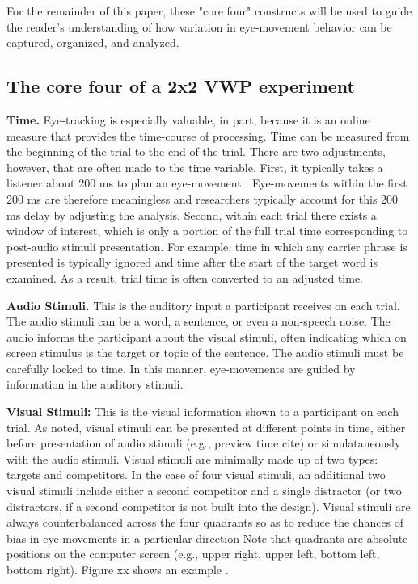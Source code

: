 For the remainder of this paper, these "core four" constructs will be used to guide the reader's understanding of how variation in eye-movement behavior can be captured, organized, and analyzed. 

\subsection{The core four of a 2x2 VWP experiment}

\textbf{Time.} Eye-tracking is especially valuable, in part, because it is an online measure that provides the time-course of processing. Time can be measured from the beginning of the trial to the end of the trial. There are two adjustments, however, that are often made to the time variable. First, it typically takes a listener about 200 ms to plan an eye-movement \parencite[][]{Matin_Shao_Boff_1993}. Eye-movements within the first 200 ms are therefore meaningless and researchers typically account for this 200 ms delay by adjusting the analysis. Second, within each trial there exists a window of interest, which is only a portion of the full trial time corresponding to post-audio stimuli presentation. For example, time in which any carrier phrase is presented is typically ignored and time after the start of the target word is examined. As a result, trial time is often converted to an adjusted time.

\textbf{Audio Stimuli.} This is the auditory input a participant receives on each trial. The audio stimuli can be a word, a sentence, or even a non-speech noise. The audio informs the participant about the visual stimuli, often indicating which on screen stimulus is the target or topic of the sentence. The audio stimuli must be carefully locked to time. In this manner, eye-movements are guided by information in the auditory stimuli.   

\textbf{Visual Stimuli:} This is the visual information shown to a participant on each trial. As noted, visual stimuli can be presented at different points in time, either before presentation of audio stimuli (e.g., preview time cite) or simulataneously with the audio stimuli. Visual stimuli are minimally made up of two types: targets and competitors. In the case of four visual stimuli, an additional two visual stimuli include either a second competitor and a single distractor (or two distractors, if a second competitor is not built into the design). Visual stimuli are always counterbalanced across the four quadrants so as to reduce the chances of bias in eye-movements in a particular direction Note that quadrants are absolute positions on the computer screen (e.g., upper right, upper left, bottom left, bottom right). Figure xx shows an example . 

